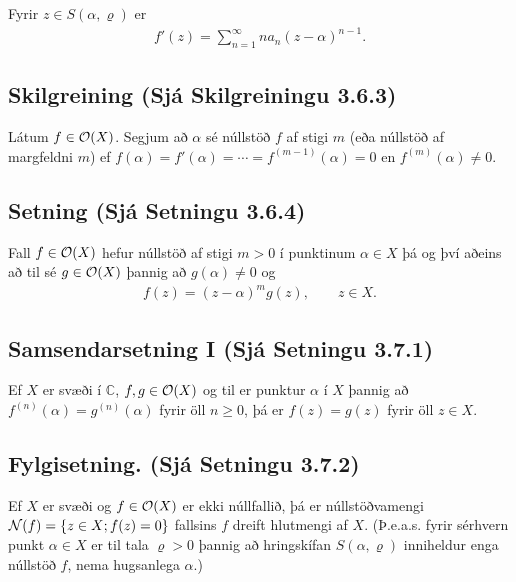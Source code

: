 \documentclass[a4paper,10pt,icelandic]{sphinxmanual}
\begin{document}
Fyrir \(z\in S(\alpha, \varrho)\) er
\begin{equation*}
\begin{split}f'(z)= \sum_{n=1}^\infty na_n(z-\alpha)^{n-1}.\end{split}
\end{equation*}

\subsection{Skilgreining (Sjá Skilgreiningu 3.6.3)}
\label{\detokenize{Kafli03:skilgreining-sja-skilgreiningu-3-6-3}}
Látum \(f\in {\cal O}(X)\). Segjum að \(\alpha\) sé núllstöð \(f\) af stigi \(m\) (eða núllstöð af margfeldni \(m\)) ef \(f(\alpha)=f'(\alpha)=\cdots=f^{(m-1)}(\alpha)=0\) en \(f^{(m)}(\alpha)\neq 0\).


\subsection{Setning (Sjá Setningu 3.6.4)}
\label{\detokenize{Kafli03:setning-sja-setningu-3-6-4}}
Fall \(f\in {\cal O}(X)\) hefur núllstöð af stigi \(m>0\) í punktinum \(\alpha\in X\) þá og því aðeins að til sé \(g\in {\cal O}(X)\) þannig að \(g(\alpha)\neq 0\) og
\begin{equation*}
\begin{split}f(z)=(z-\alpha)^ mg(z), \qquad z\in X.\end{split}
\end{equation*}

\subsection{Samsendarsetning I (Sjá Setningu 3.7.1)}
\label{\detokenize{Kafli03:samsendarsetning-i-sja-setningu-3-7-1}}
Ef \(X\) er svæði í \({\mathbb{C}}\), \(f,g\in {\cal O}(X)\) og til er punktur \({\alpha}\) í \(X\) þannig að \(f^{(n)}({\alpha})=g^{(n)}({\alpha})\) fyrir öll \(n\geq 0\), þá er \(f(z)=g(z)\) fyrir öll \(z\in X\).


\subsection{Fylgisetning. (Sjá Setningu 3.7.2)}
\label{\detokenize{Kafli03:fylgisetning-sja-setningu-3-7-2}}
Ef \(X\) er svæði og \(f\in {\cal O}(X)\) er ekki núllfallið, þá er núllstöðvamengi \({\cal N}(f)=\{z\in X; f(z)=0\}\) fallsins \(f\) dreift hlutmengi af \(X\). (Þ.e.a.s. fyrir sérhvern punkt \(\alpha\in X\) er til tala \(\varrho>0\) þannig að hringskífan \(S(\alpha,\varrho)\) inniheldur enga núllstöð \(f\), nema hugsanlega \(\alpha\).)
\end{document}

